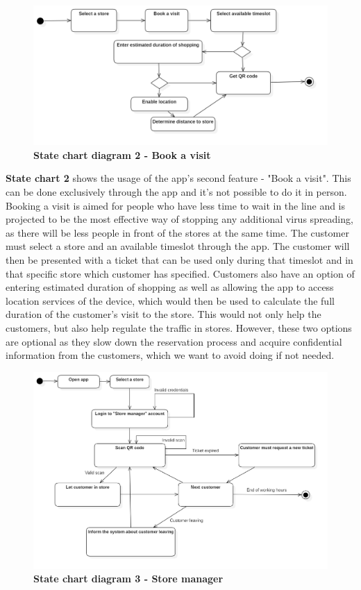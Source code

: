 \begin{figure}[!htb]
\centering
\includegraphics[width=\textwidth]{Images/StatechartDiagram2_BookAVisit}
\caption{\label{fig:statechart2}\textbf{State chart diagram 2 - Book a visit}}
\end{figure}

\hspace{\parindent}\textbf{State chart 2} shows the usage of the app's second feature - "Book a visit". This can be done exclusively through the app and it's not possible to do it in person. Booking a visit is aimed for people who have less time to wait in the line and is projected to be the most effective way of stopping any additional virus spreading, as there will be less people in front of the stores at the same time. The customer must select a store and an available timeslot through the app. The customer will then be presented with a ticket that can be used only during that timeslot and in that specific store which customer has specified. Customers also have an option of entering estimated duration of shopping as well as allowing the app to access location services of the device, which would then be used to calculate the full duration of the customer's visit to the store. This would not only help the customers, but also help regulate the traffic in stores. However, these two options are optional as they slow down the reservation process and acquire confidential information from the customers, which we want to avoid doing if not needed.

\newpage

\begin{figure}[!htb]
\centering
\includegraphics[width=\textwidth]{Images/StatechartDiagram3_StoreManager}
\caption{\label{fig:statechart3}\textbf{State chart diagram 3 - Store manager}}
\end{figure}

